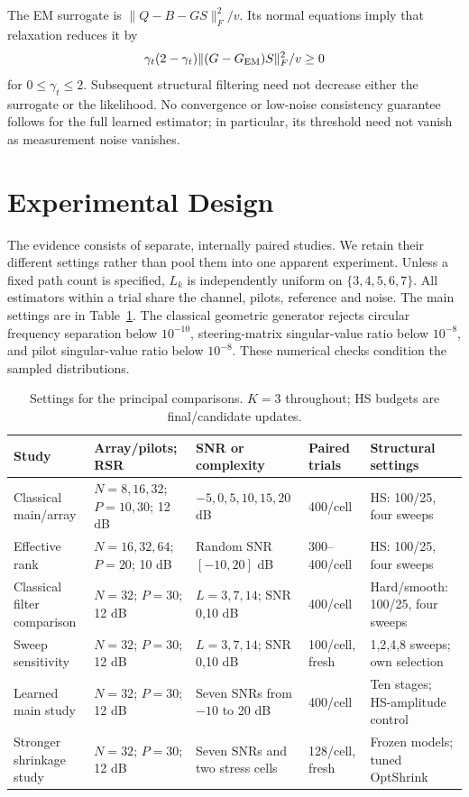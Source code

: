 \documentclass[10pt,journal,letterpaper]{IEEEtran}
\begin{document}
The EM surrogate is $\|Q-B-GS\|_F^2/v$. Its normal equations imply that relaxation reduces it by
\begin{equation}
 \gamma_t(2-\gamma_t)\|(G-G_{\rm EM})S\|_F^2/v\ge0
\end{equation}
for $0\le\gamma_t\le2$. Subsequent structural filtering need not decrease either the surrogate or the likelihood. No convergence or low-noise consistency guarantee follows for the full learned estimator; in particular, its threshold need not vanish as measurement noise vanishes.

\section{Experimental Design}
\label{sec:experiments}
The evidence consists of separate, internally paired studies. We retain their different settings rather than pool them into one apparent experiment. Unless a fixed path count is specified, $L_k$ is independently uniform on $\{3,4,5,6,7\}$. All estimators within a trial share the channel, pilots, reference and noise. The main settings are in Table~\ref{tab:settings}. The classical geometric generator rejects circular frequency separation below $10^{-10}$, steering-matrix singular-value ratio below $10^{-8}$, and pilot singular-value ratio below $10^{-8}$. These numerical checks condition the sampled distributions.

\begin{table}[!t]
\caption{Settings for the principal comparisons. $K=3$ throughout; HS budgets are final/candidate updates.}
\label{tab:settings}\centering\footnotesize
\begin{tabular}{@{}p{1.13in}p{1.33in}p{1.27in}p{0.90in}p{1.16in}@{}}\toprule
Study & Array/pilots; RSR & SNR or complexity & Paired trials & Structural settings\\\midrule
Classical main/array & $N=8,16,32$; $P=10,30$; 12 dB & $-5,0,5,10,15,20$ dB & 400/cell & HS: 100/25, four sweeps\\
Effective rank & $N=16,32,64$; $P=20$; 10 dB & Random SNR $[-10,20]$ dB & 300--400/cell & HS: 100/25, four sweeps\\
Classical filter comparison & $N=32$; $P=30$; 12 dB & $L=3,7,14$; SNR 0,10 dB & 400/cell & Hard/smooth: 100/25, four sweeps\\
Sweep sensitivity & $N=32$; $P=30$; 12 dB & $L=3,7,14$; SNR 0,10 dB & 100/cell, fresh & 1,2,4,8 sweeps; own selection\\
Learned main study & $N=32$; $P=30$; 12 dB & Seven SNRs from $-10$ to 20 dB & 400/cell & Ten stages; HS-amplitude control\\
Stronger shrinkage study & $N=32$; $P=30$; 12 dB & Seven SNRs and two stress cells & 128/cell, fresh & Frozen models; tuned OptShrink\\\bottomrule
\end{tabular}
\end{table}
\end{document}
